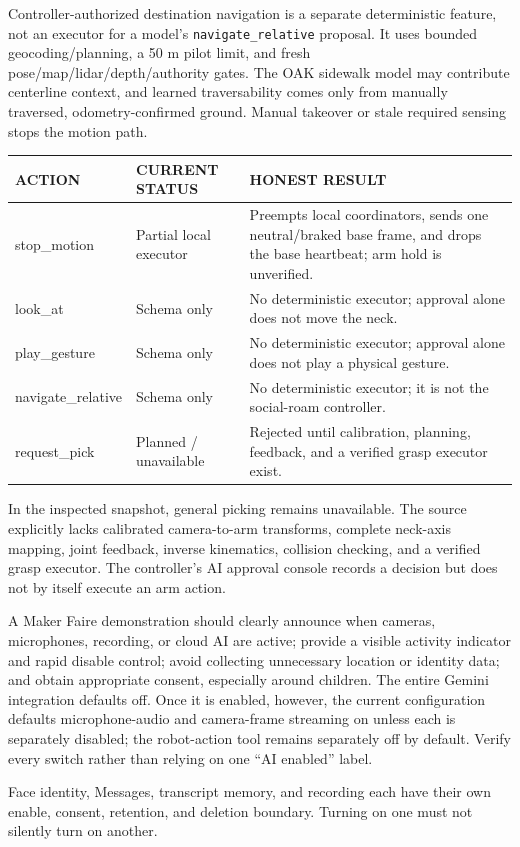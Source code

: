 \documentclass[11pt,openany]{book}
\begin{document}
Controller-authorized destination navigation is a separate deterministic feature, not an executor for a model's \texttt{navigate\_relative} proposal. It uses bounded geocoding/planning, a 50 m pilot limit, and fresh pose/map/lidar/depth/authority gates. The OAK sidewalk model may contribute centerline context, and learned traversability comes only from manually traversed, odometry-confirmed ground. Manual takeover or stale required sensing stops the motion path.

\begin{tabularx}{\textwidth}{>{\ttfamily\scriptsize}p{1.35in} p{1.25in} X}
\toprule
ACTION & CURRENT STATUS & HONEST RESULT\\
\midrule
stop\_motion & Partial local executor & Preempts local coordinators, sends one neutral/braked base frame, and drops the base heartbeat; arm hold is unverified.\\
look\_at & Schema only & No deterministic executor; approval alone does not move the neck.\\
play\_gesture & Schema only & No deterministic executor; approval alone does not play a physical gesture.\\
navigate\_relative & Schema only & No deterministic executor; it is not the social-roam controller.\\
request\_pick & Planned / unavailable & Rejected until calibration, planning, feedback, and a verified grasp executor exist.\\
\bottomrule
\end{tabularx}

\begin{fieldnotebox}
In the inspected snapshot, general picking remains unavailable. The source explicitly lacks calibrated camera-to-arm transforms, complete neck-axis mapping, joint feedback, inverse kinematics, collision checking, and a verified grasp executor. The controller's AI approval console records a decision but does not by itself execute an arm action.
\end{fieldnotebox}

\begin{safetybox}[title={PUBLIC CAMERA AND MICROPHONE NOTICE}]
A Maker Faire demonstration should clearly announce when cameras, microphones, recording, or cloud AI are active; provide a visible activity indicator and rapid disable control; avoid collecting unnecessary location or identity data; and obtain appropriate consent, especially around children. The entire Gemini integration defaults off. Once it is enabled, however, the current configuration defaults microphone-audio and camera-frame streaming on unless each is separately disabled; the robot-action tool remains separately off by default. Verify every switch rather than relying on one ``AI enabled'' label.

Face identity, Messages, transcript memory, and recording each have their own enable, consent, retention, and deletion boundary. Turning on one must not silently turn on another.
\end{safetybox}
\end{document}
